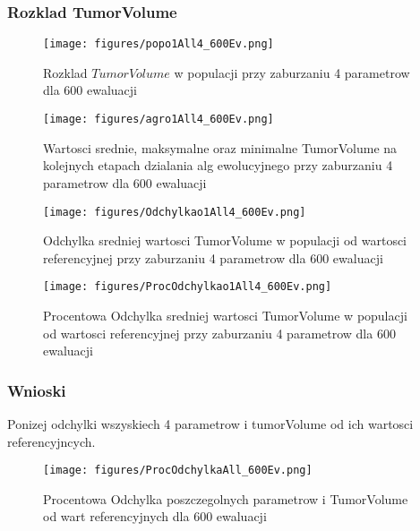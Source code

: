 \documentclass[]{article}
\begin{document}
\newpage

\subsubsection{Rozklad TumorVolume}\label{rozklad-tumorvolume-1}

\begin{figure}[htbp]
\centering
\texttt{[image: figures/popo1All4\_600Ev.png]}
\caption{Rozklad \(TumorVolume\) w populacji przy zaburzaniu 4
parametrow dla 600 ewaluacji}
\end{figure}

\begin{figure}[htbp]
\centering
\texttt{[image: figures/agro1All4\_600Ev.png]}
\caption{Wartosci srednie, maksymalne oraz minimalne TumorVolume na
kolejnych etapach dzialania alg ewolucyjnego przy zaburzaniu 4
parametrow dla 600 ewaluacji}
\end{figure}

\begin{figure}[htbp]
\centering
\texttt{[image: figures/Odchylkao1All4\_600Ev.png]}
\caption{Odchylka sredniej wartosci TumorVolume w populacji od wartosci
referencyjnej przy zaburzaniu 4 parametrow dla 600 ewaluacji}
\end{figure}

\begin{figure}[htbp]
\centering
\texttt{[image: figures/ProcOdchylkao1All4\_600Ev.png]}
\caption{Procentowa Odchylka sredniej wartosci TumorVolume w populacji
od wartosci referencyjnej przy zaburzaniu 4 parametrow dla 600
ewaluacji}
\end{figure}

\newpage

\subsubsection{Wnioski}\label{wnioski-1}

Ponizej odchylki wszyskiech 4 parametrow i tumorVolume od ich wartosci
referencyjncych.

\begin{figure}[htbp]
\centering
\texttt{[image: figures/ProcOdchylkaAll\_600Ev.png]}
\caption{Procentowa Odchylka poszczegolnych parametrow i TumorVolume od
wart referencyjnych dla 600 ewaluacji}
\end{figure}

\newpage
\end{document}
